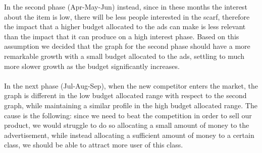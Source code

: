  \newpage
In the second phase (Apr-May-Jun) instead, since in these months the interest about the item is low, there will be less people interested in the scarf, therefore the impact that a higher budget allocated to the ads can make is less relevant than the impact that it can produce on a high interest phase. Based on this assumption we decided that the graph for the second phase should have a more remarkable growth with a small budget allocated to the ads, settling to much more slower growth as the budget significantly increases. \\\\
 \newpage
In the next phase (Jul-Aug-Sep), when the new competitor enters the market, the graph is different in the low budget allocated range with respect to the second graph, while maintaining a similar profile in the high budget allocated range. The cause is the following: since we need to beat the competition in order to sell our product, we would struggle to do so allocating a small amount of money to the advertisement, while instead allocating a sufficient amount of money to a certain class, we should be able to attract more user of this class. \\\\
